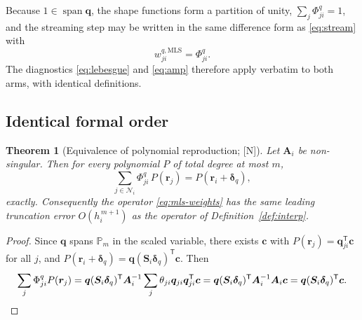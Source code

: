 \documentclass[11pt,a4paper]{article}
\newcommand{\New}{\textcolor{blue!60!black}{\textsf{[N]}}}
\newtheorem{theorem}{Theorem}
\begin{document}
Because $1\in\operatorname{span}\bm q$, the shape functions form a partition of unity,
$\sum_j\Phi^{q}_{ji}=1$, and the streaming step may be written in the same difference
form as \eqref{eq:stream} with
\begin{equation}
w^{q,\mathrm{MLS}}_{ji}=\Phi^{q}_{ji}.
\label{eq:mls-weights}
\end{equation}
The diagnostics \eqref{eq:lebesgue} and \eqref{eq:amp} therefore apply verbatim to
both arms, with identical definitions.

\subsection{Identical formal order}

\begin{theorem}[Equivalence of polynomial reproduction; \New]
\label{thm:mls}
Let $\bm A_i$ be non-singular. Then for every polynomial $P$ of total degree at most
$m$,
\begin{equation*}
\sum_{j\in\mathcal N_i}\Phi^{q}_{ji}\,P(\bm r_j)=P(\bm r_i+\bm\delta_q),
\end{equation*}
exactly. Consequently the operator \eqref{eq:mls-weights} has the same leading
truncation error $O(h_i^{\,m+1})$ as the operator of Definition~\ref{def:interp}.
\end{theorem}

\begin{proof}
Since $\bm q$ spans $\mathbb P_m$ in the scaled variable, there exists $\bm c$ with
$P(\bm r_j)=\bm q_{ji}^{\mathsf T}\bm c$ for all $j$, and
$P(\bm r_i+\bm\delta_q)=\bm q(\bm S_i\bm\delta_q)^{\mathsf T}\bm c$. Then
\begin{equation*}
\sum_j\Phi^{q}_{ji}P(\bm r_j)
=\bm q(\bm S_i\bm\delta_q)^{\mathsf T}\bm A_i^{-1}
\sum_j\theta_{ji}\bm q_{ji}\bm q_{ji}^{\mathsf T}\bm c
=\bm q(\bm S_i\bm\delta_q)^{\mathsf T}\bm A_i^{-1}\bm A_i\bm c
=\bm q(\bm S_i\bm\delta_q)^{\mathsf T}\bm c . \qedhere
\end{equation*}
\end{proof}

\begin{center}
\end{center}
\end{document}
